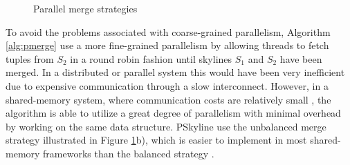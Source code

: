 \documentclass[12pt,a4paper,twoside]{report}
\begin{document}
\begin{figure}[H]

	\tikzset{
		partition/.style=draw,rectangle,minimum height=5mm,minimum width=5mm
	}
	\quad
	\caption{Parallel merge strategies}
	\label{fig:pmerge}
\end{figure}

To avoid the problems associated with coarse-grained parallelism,
Algorithm \ref{alg:pmerge} use a more fine-grained parallelism by
allowing threads to fetch tuples from $S_2$ in a round robin fashion
until skylines $S_1$ and $S_2$ have been merged. In a distributed or
parallel system this would have been very inefficient due to expensive
communication through a slow interconnect. However, in a shared-memory
system, where communication costs are relatively small
\cite{meneghin2012performance}, the algorithm is able to utilize a
great degree of parallelism with minimal overhead by working on the
same data structure. PSkyline use the unbalanced merge strategy
illustrated in Figure \ref{fig:pmerge}b), which is easier to implement
in most shared-memory frameworks
\cite{dagum1998openmp,randall1998cilk,cantonnet2004productivity,willhalm2008putting} than
the balanced strategy .
\end{document}
